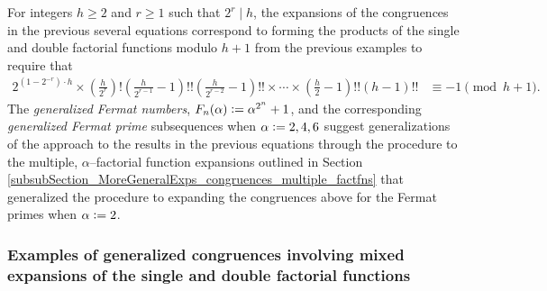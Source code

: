 \documentclass[12pt,reqno]{article}
\numberwithin{sfootnote}{section}
\numberwithin{equation}{section}
\theoremstyle{plain}
\theoremstyle{definition}
\theoremstyle{remark}
\newcommand{\defequals}{\ensuremath{\vcentcolon=}}
\begin{document}
For integers $h \geq 2$ and $r \geq 1$ such that $2^{r} \mid h$, the 
expansions of the congruences in the previous several equations correspond to 
forming the products of the single and double factorial functions 
modulo $h+1$ from the previous examples to require that 
\begin{align*} 
2^{\left(1-2^{-r}\right) \cdot h} \times \left(\frac{h}{2^{r}}\right)! 
     \left(\frac{h}{2^{r-1}} -1\right)!! 
     \left(\frac{h}{2^{r-2}} -1\right)!! \times \cdots \times 
     \left(\frac{h}{2} -1\right)!! 
     \left(h -1\right)!! & \equiv -1 \pmod{h+1}. 
\end{align*} 
The \emph{generalized Fermat numbers}, 
$F_n(\alpha) \defequals \alpha^{2^n}+1$, and the corresponding 
\emph{generalized Fermat prime} subsequences 
when $\alpha \defequals 2, 4, 6$ suggest generalizations of the 
approach to the results in the previous equations through the 
procedure to the multiple, $\alpha$--factorial function expansions outlined in 
Section \ref{subsubSection_MoreGeneralExps_congruences_multiple_factfns} 
that generalized the procedure to expanding the congruences above for the 
Fermat primes when $\alpha \defequals 2$. 

\subsubsection{Examples of generalized congruences 
               involving mixed expansions of the 
               single and double factorial functions} 
\end{document}
